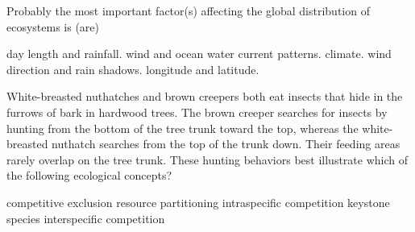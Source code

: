 \question
Probably the most important factor(s) affecting the global distribution of ecosystems is (are)

\begin{choices}
\choice day length and rainfall.
\choice wind and ocean water current patterns.
\correctchoice climate.
\choice wind direction and rain shadows.
\choice longitude and latitude.
\end{choices}

\question
White-breasted nuthatches and brown creepers both eat insects that hide in the furrows of bark in hardwood trees. The brown creeper searches for insects by hunting from the bottom of the tree trunk toward the top, whereas the white-breasted nuthatch searches from the top of the trunk down. Their feeding areas rarely overlap on the tree trunk. These hunting behaviors best illustrate which of the following ecological concepts?

\begin{choices}
\choice competitive exclusion
\correctchoice resource partitioning
\choice intraspecific competition
\choice keystone species
\choice interspecific competition
\end{choices}
